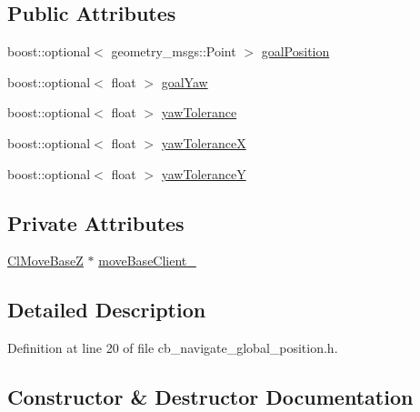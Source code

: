 \subsection*{Public Attributes}
\begin{DoxyCompactItemize}
\item 
boost\+::optional$<$ geometry\+\_\+msgs\+::\+Point $>$ \hyperlink{classcl__move__base__z_1_1CbNavigateGlobalPosition_a51a0266fd9a63e99f26e88933529c559}{goal\+Position}
\item 
boost\+::optional$<$ float $>$ \hyperlink{classcl__move__base__z_1_1CbNavigateGlobalPosition_a839900de7f664b27c9be189fadbaa003}{goal\+Yaw}
\item 
boost\+::optional$<$ float $>$ \hyperlink{classcl__move__base__z_1_1CbNavigateGlobalPosition_af7c005e386a5062091618384534cd2b9}{yaw\+Tolerance}
\item 
boost\+::optional$<$ float $>$ \hyperlink{classcl__move__base__z_1_1CbNavigateGlobalPosition_a3e649f9ae9f1118c4f08332e4d5908dc}{yaw\+ToleranceX}
\item 
boost\+::optional$<$ float $>$ \hyperlink{classcl__move__base__z_1_1CbNavigateGlobalPosition_a2405f30f99b72c7daae79175f3e78677}{yaw\+ToleranceY}
\end{DoxyCompactItemize}
\subsection*{Private Attributes}
\begin{DoxyCompactItemize}
\item 
\hyperlink{classcl__move__base__z_1_1ClMoveBaseZ}{Cl\+Move\+BaseZ} $\ast$ \hyperlink{classcl__move__base__z_1_1CbNavigateGlobalPosition_a460d6b43834cb52baa94d22cd3a6fd2b}{move\+Base\+Client\+\_\+}
\end{DoxyCompactItemize}


\subsection{Detailed Description}


Definition at line 20 of file cb\+\_\+navigate\+\_\+global\+\_\+position.\+h.



\subsection{Constructor \& Destructor Documentation}
\mbox{\label{classcl__move__base__z_1_1CbNavigateGlobalPosition_aec75d2481b2057bbbdad9513c4dc08cd}} 
